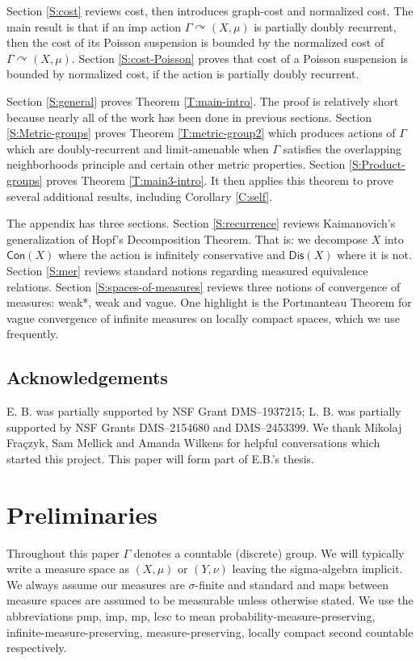 \documentclass[12pt]{article}
\theoremstyle{plain}
\theoremstyle{definition}
\theoremstyle{remark}
\newcommand{\G}{\Gamma}
\newcommand\s{\sigma}
\def\cc{{\curvearrowright}}
\begin{document}
 Section \ref{S:cost} reviews cost, then introduces graph-cost and normalized cost. The main result is that if an imp action $\G \cc (X,\mu)$ is partially doubly recurrent, then the cost of its Poisson suspension is bounded by the normalized cost of $\G \cc (X,\mu)$. Section \ref{S:cost-Poisson} proves that cost of a Poisson suspension is bounded by normalized cost, if the action is partially doubly recurrent.

  Section \ref{S:general} proves Theorem \ref{T:main-intro}. The proof is relatively short because nearly all of the work has been done in previous sections.  Section \ref{S:Metric-groups} proves Theorem \ref{T:metric-group2} which produces actions of $\G$ which are doubly-recurrent and limit-amenable when $\G$ satisfies the overlapping neighborhoods principle and certain other metric properties.   Section \ref{S:Product-groups} proves Theorem \ref{T:main3-intro}. It then applies this theorem to prove several additional results, including Corollary \ref{C:self}.

 The appendix has three sections. Section \ref{S:recurrence} reviews Kaimanovich's generalization of Hopf's Decomposition Theorem. That is: we decompose $X$ into $\mathsf{Con}(X)$ where the action is infinitely conservative and $\mathsf{Dis}(X)$ where it is not.  Section \ref{S:mer} reviews standard notions regarding measured equivalence relations.    Section \ref{S:spaces-of-measures} reviews three notions of convergence of measures: weak*, weak and vague. One highlight is the Portmanteau Theorem for vague convergence of infinite measures on locally compact spaces, which we use frequently. 

    


\subsection{Acknowledgements}
E. B. was partially supported by NSF Grant DMS--1937215; L. B. was partially supported by NSF Grants DMS--2154680 and DMS--2453399. We thank Mikolaj Fra\c czyk, Sam Mellick and Amanda Wilkens for helpful conversations which started this project. This paper will form part of E.B.'s thesis.


\section{Preliminaries}

Throughout this paper $\G$ denotes a countable (discrete) group. We will typically write a measure space as $(X,\mu)$ or $(Y,\nu)$ leaving the sigma-algebra implicit. We always assume our measures are $\s$-finite and standard and maps between measure spaces are assumed to be measurable unless otherwise stated. We use the abbreviations pmp, imp, mp, lcsc to mean probability-measure-preserving, infinite-measure-preserving, measure-preserving, locally compact second countable respectively.
\end{document}
